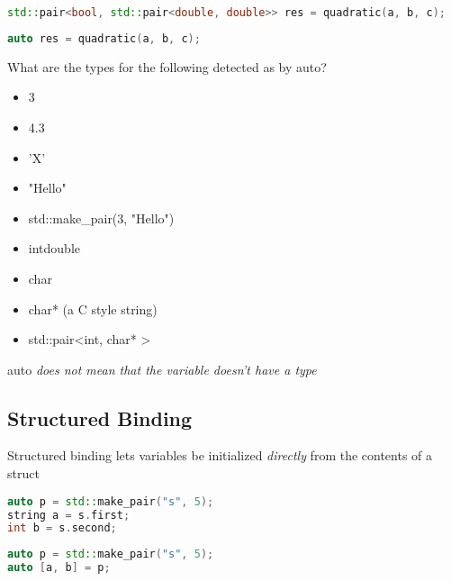 \documentclass[]{article}
\begin{document}
\begin{lstlisting}[language=C++, numbers=none, caption=Writing the full type]
std::pair<bool, std::pair<double, double>> res = quadratic(a, b, c);
\end{lstlisting}

\begin{lstlisting}[language=C++, numbers=none, caption=The same code using auto]
auto res = quadratic(a, b, c);
\end{lstlisting}

\begin{question}
    What are the types for the following detected as by auto?
    \begin{itemize}
        \item 3
        \item 4.3
        \item 'X'
        \item "Hello"
        \item std::make\_pair(3, "Hello")
    \end{itemize}
\end{question}

\begin{answer}
    \begin{itemize}
        \item intdouble
        \item char
        \item char* (a C style string)
        \item std::pair\textless int, char* \textgreater
    \end{itemize}
\end{answer}

\begin{note}
    auto \emph{does not mean that the variable doesn't have a type}
\end{note}

\subsection{Structured Binding}
\begin{definition}
Structured binding lets variables be initialized \emph{directly} from the contents of a struct
\end{definition}
\begin{minipage}{0.5\linewidth}
\begin{lstlisting}[language=C++, caption=Before, numbers=none]
auto p = std::make_pair("s", 5);
string a = s.first;
int b = s.second;
\end{lstlisting}
\end{minipage}
\begin{minipage}{0.45\linewidth}
\begin{lstlisting}[language=C++, caption=After, numbers=none]
auto p = std::make_pair("s", 5);
auto [a, b] = p;
\end{lstlisting}
\end{minipage}
\end{document}
